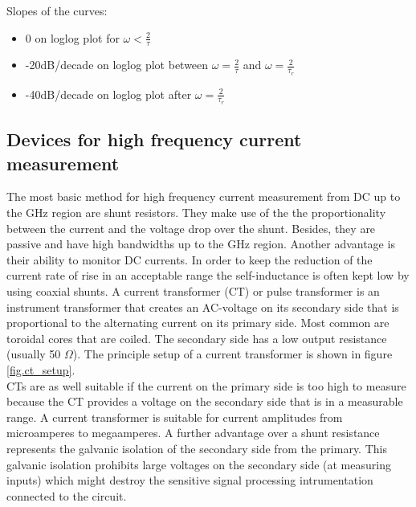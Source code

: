 Slopes of the curves: \newline
\begin{itemize}
 \item 0 on loglog plot for $\omega < \frac{2}{\tau}$\newline
\item -20dB/decade on loglog plot between $\omega = \frac{2}{\tau}$ and $\omega = \frac{2}{\tau_r}$ \newline
\item -40dB/decade on loglog plot after $\omega = \frac{2}{\tau_r}$\newline

\end{itemize}




	
\subsection{Devices for high frequency current measurement}
The most basic method for high frequency current measurement from DC up to the GHz region are shunt resistors. They make use of the the proportionality between the current and the voltage drop over the shunt. Besides, they are passive and have high bandwidths up to the GHz region. Another advantage is their ability to monitor DC currents. In order to keep the reduction of the current rate of rise in an acceptable range the self-inductance is often kept low by using coaxial shunts.\newline \cite{highdynamiccurrent}
A current transformer (CT) or pulse transformer is an instrument transformer that creates an AC-voltage on its secondary side that is proportional to the alternating current on its primary side. Most common are toroidal cores that are coiled. The secondary side has a low output resistance (usually 50 $\Omega$).
The principle setup of a current transformer is shown in figure \ref{fig.ct_setup}. 
\\CTs are as well suitable if the current on the primary side is too high to measure because the CT provides a voltage on the secondary side that is in a measurable range. A current transformer is suitable for current amplitudes from microamperes to megaamperes. A further advantage over a shunt resistance represents the galvanic isolation of the secondary side from the primary. This galvanic isolation prohibits large voltages on the secondary side (at measuring inputs) which might destroy the sensitive signal processing intrumentation connected to the circuit. 
